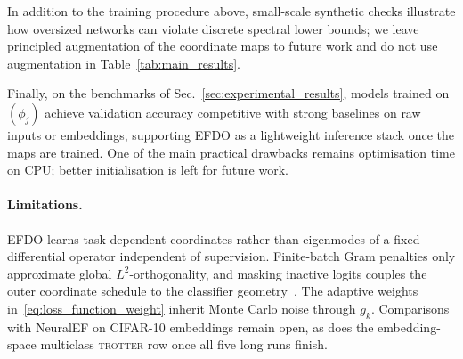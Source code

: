\documentclass{article}
\theoremstyle{plain}
\theoremstyle{definition}
\theoremstyle{remark}
\begin{document}
In addition to the training procedure above, small-scale synthetic checks illustrate how oversized networks can violate discrete spectral lower bounds; we leave principled augmentation of the coordinate maps to future work and do not use augmentation in Table~\ref{tab:main_results}.

Finally, on the benchmarks of Sec.~\ref{sec:experimental_results}, models trained on $(\phi_j)$ achieve validation accuracy competitive with strong baselines on raw inputs or embeddings, supporting EFDO as a lightweight inference stack once the maps are trained.
One of the main practical drawbacks remains optimisation time on CPU; better initialisation is left for future work.

\paragraph{Limitations.}
EFDO learns task-dependent coordinates rather than eigenmodes of a fixed differential operator independent of supervision.
Finite-batch Gram penalties only approximate global $L^2$-orthogonality, and masking inactive logits couples the outer coordinate schedule to the classifier geometry~\citep{pmlr-v162-deng22b}.
The adaptive weights in~\eqref{eq:loss_function_weight} inherit Monte Carlo noise through $g_k$.
Comparisons with NeuralEF on CIFAR-10 embeddings remain open, as does the embedding-space multiclass \textsc{trotter} row once all five long runs finish.



\end{document}
